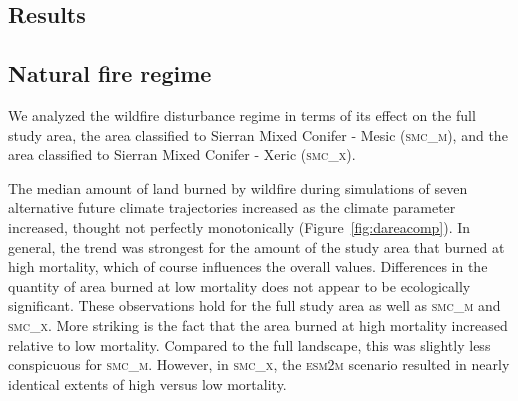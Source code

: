 \documentclass[12pt]{article}
\begin{document}
\begin{spacing}{1}
\section{Results}

\subsection*{Natural fire regime}

We analyzed the wildfire disturbance regime in terms of its effect on the full study area, the area classified to Sierran Mixed Conifer - Mesic (\textsc{smc\_m}), and the area classified to Sierran Mixed Conifer - Xeric (\textsc{smc\_x}).

The median amount of land burned by wildfire during simulations of seven alternative future climate trajectories increased as the climate parameter increased, thought not perfectly monotonically (Figure~\ref{fig:dareacomp}). In general, the trend was strongest for the amount of the study area that burned at high mortality, which of course influences the overall values. Differences in the quantity of area burned at low mortality does not appear to be ecologically significant. These observations hold for the full study area as well as \textsc{smc\_m} and \textsc{smc\_x}. More striking is the fact that the area burned at high mortality increased relative to low mortality. Compared to the full landscape, this was slightly less conspicuous for \textsc{smc\_m}. However, in \textsc{smc\_x}, the \textsc{esm2m} scenario resulted in nearly identical extents of high versus low mortality. 




\end{spacing}
\end{document}
